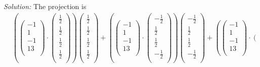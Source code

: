 \documentclass{article}
\begin{document}
\newline\textit{Solution:} The projection is \begin{align*}
  & \left( \left( \begin{matrix}
   -1  \\
   1  \\
   -1  \\
   13  \\
\end{matrix} \right)\cdot \left( \begin{matrix}
   \frac{1}{2}  \\
   \frac{1}{2}  \\
   \frac{1}{2}  \\
   \frac{1}{2}  \\
\end{matrix} \right) \right)\left( \begin{matrix}
   \frac{1}{2}  \\
   \frac{1}{2}  \\
   \frac{1}{2}  \\
   \frac{1}{2}  \\
\end{matrix} \right)+\left( \left( \begin{matrix}
   -1  \\
   1  \\
   -1  \\
   13  \\
\end{matrix} \right)\cdot \left( \begin{matrix}
   -\frac{1}{2}  \\
   \frac{1}{2}  \\
   \frac{1}{2}  \\
   -\frac{1}{2}  \\
\end{matrix} \right) \right)\left( \begin{matrix}
   -\frac{1}{2}  \\
   \frac{1}{2}  \\
   \frac{1}{2}  \\
   -\frac{1}{2}  \\
\end{matrix} \right)+\left( \left( \begin{matrix}
   -1  \\
   1  \\
   -1  \\
   13  \\
\end{matrix} \right)\cdot \left( \begin{matrix}

\end{matrix}
\end{align*}
\end{document}
